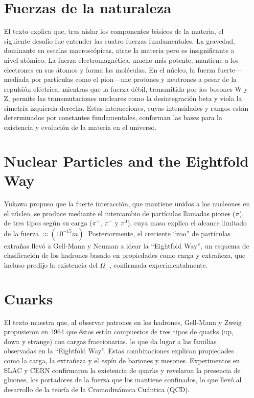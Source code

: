\documentclass[12pt]{article}
\begin{document}
\section{Fuerzas de la naturaleza}
El texto explica que, tras aislar los componentes básicos de la materia, el siguiente desafío fue entender las cuatro fuerzas fundamentales. La gravedad, dominante en escalas macroscópicas, atrae la materia pero es insignificante a nivel atómico. La fuerza electromagnética, mucho más potente, mantiene a los electrones en sus átomos y forma las moléculas. En el núcleo, la fuerza fuerte—mediada por partículas como el pion—une protones y neutrones a pesar de la repulsión eléctrica, mientras que la fuerza débil, transmitida por los bosones W y Z, permite las transmutaciones nucleares como la desintegración beta y viola la simetría izquierda-derecha. Estas interacciones, cuyas intensidades y rangos están determinados por constantes fundamentales, conforman las bases para la existencia y evolución de la materia en el universo.

\section{Nuclear Particles and the Eightfold Way}
Yukawa propuso que la fuerte interacción, que mantiene unidos a los nucleones en el núcleo, se produce mediante el intercambio de partículas llamadas piones ($\pi$), de tres tipos según su carga ($\pi^{+}$, $\pi^{-}$ y $\pi^{0}$), cuya masa explica el alcance limitado de la fuerza $\approx(10^{-15} m)$. Posteriormente, el creciente “zoo” de partículas extrañas llevó a Gell-Mann y Neuman a idear la “Eightfold Way”, un esquema de clasificación de los hadrones basado en propiedades como carga y extrañeza, que incluso predijo la existencia del $\Omega^{-}$, confirmada experimentalmente.

\section{Cuarks}
El texto muestra que, al observar patrones en los hadrones, Gell-Mann y Zweig propusieron en 1964 que éstos están compuestos de tres tipos de quarks (up, down y strange) con cargas fraccionarias, lo que da lugar a las familias observadas en la “Eightfold Way”. Estas combinaciones explican propiedades como la carga, la extrañeza y el espín de bariones y mesones. Experimentos en SLAC y CERN confirmaron la existencia de quarks y revelaron la presencia de gluones, los portadores de la fuerza que los mantiene confinados, lo que llevó al desarrollo de la teoría de la Cromodinámica Cuántica (QCD).
\end{document}
